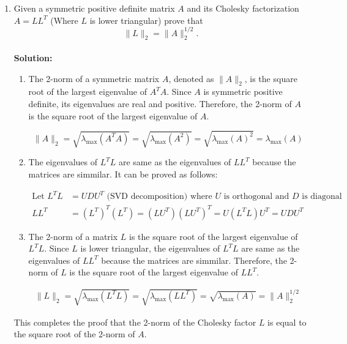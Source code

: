 \documentclass[11pt,onecolumn]{article}
\begin{document}
\begin{enumerate}[label=(\alph*)]
    \item Given a symmetric positive definite matrix $A$ and its Cholesky factorization $A = LL^T$ (Where $L$ is lower triangular) prove that
          \[
              \|L\|_2 = \|A\|_2^{1/2}.
          \] \\
          \textbf{Solution:} \begin{enumerate}
              \item The 2-norm of a symmetric matrix \(A\), denoted as \(\|A\|_2\), is the square root of the largest eigenvalue of \(A^TA\). Since \(A\) is symmetric positive definite, its eigenvalues are real and positive. Therefore, the 2-norm of \(A\) is the square root of the largest eigenvalue of \(A\).

                    \[
                        \|A\|_2 = \sqrt{\lambda_{\text{max}}(A^TA)} = \sqrt{\lambda_{\text{max}}(A^2)}  = \sqrt{\lambda_{\text{max}}(A)^2} = \lambda_{\text{max}}(A)
                    \]

              \item The eigenvalues of \(L^TL\) are same as the eigenvalues of \(LL^T\) because the matrices are simmilar. It can be proved as follows:

                    \begin{align*}
                        \text{Let } L^TL & = UDU^T \text{ (SVD decomposition) where } U \text{ is orthogonal and } D \text{ is diagonal} \\
                        LL^T             & = (L^T)^T(L^T) = (LU^T)(LU^T)^T = U(L^TL)U^T = UDU^T
                    \end{align*}

              \item The 2-norm of a matrix \(L\) is the square root of the largest eigenvalue of \(L^TL\). Since \(L\) is lower triangular, the eigenvalues of \(L^TL\) are same as the eigenvalues of \(LL^T\) because the matrices are simmilar. Therefore, the 2-norm of \(L\) is the square root of the largest eigenvalue of \(LL^T\).

                    \begin{align*}
                        \|L\|_2 = \sqrt{\lambda_{\text{max}}(L^TL)} = \sqrt{\lambda_{\text{max}}(LL^T)} = \sqrt{\lambda_{\text{max}}(A)} = \|A\|_2^{1/2}
                    \end{align*}
          \end{enumerate}
          This completes the proof that the 2-norm of the Cholesky factor \(L\) is equal to the square root of the 2-norm of \(A\).



\end{enumerate}
\end{document}
